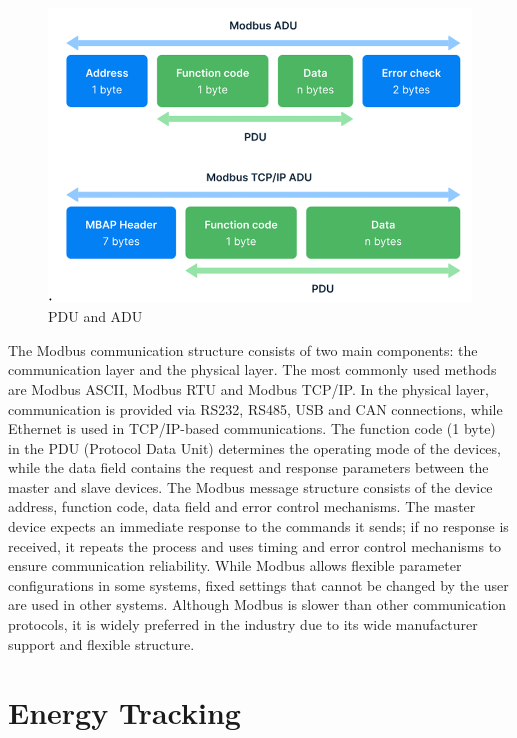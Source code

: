 \begin{figure}[H]
    \centering
    \includegraphics[width=0.8\columnwidth]{imgs/PDU and ADU.png}
    \caption[Short description for list of figures]{PDU and ADU}
    \label{fig-magnitude}
    \end{figure}%

    The Modbus communication structure consists of two main components: the communication layer and the physical layer. The most commonly used methods are Modbus ASCII, Modbus RTU and Modbus TCP/IP. In the physical layer, communication is provided via RS232, RS485, USB and CAN connections, while Ethernet is used in TCP/IP-based communications. The function code (1 byte) in the PDU (Protocol Data Unit) determines the operating mode of the devices, while the data field contains the request and response parameters between the master and slave devices.
    The Modbus message structure consists of the device address, function code, data field and error control mechanisms. The master device expects an immediate response to the commands it sends; if no response is received, it repeats the process and uses timing and error control mechanisms to ensure communication reliability. While Modbus allows flexible parameter configurations in some systems, fixed settings that cannot be changed by the user are used in other systems. Although Modbus is slower than other communication protocols, it is widely preferred in the industry due to its wide manufacturer support and flexible structure.
    



    \medskip

    \section{Energy Tracking}

